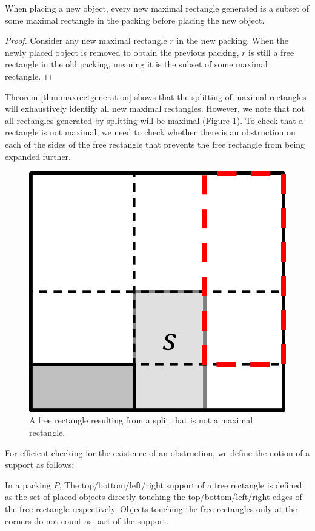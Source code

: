 \documentclass{article}
\begin{document}
\begin{thm}
\label{thm:maxrectgeneration}
When placing a new object, every new maximal rectangle generated is a subset of some maximal rectangle in the packing before placing the new object.
\end{thm}
\begin{proof}
Consider any new maximal rectangle $r$ in the new packing. When the newly placed object is removed to obtain the previous packing, $r$ is still a free rectangle in the old packing, meaning it is the subset of some maximal rectangle.
\end{proof}

Theorem \ref{thm:maxrectgeneration} shows that the splitting of maximal rectangles will exhaustively identify all new maximal rectangles. However, we note that not all rectangles generated by splitting will be maximal (Figure \ref{fig:splitbutnotmaxrect}). To check that a rectangle is not maximal, we need to check whether there is an obstruction on each of the sides of the free rectangle that prevents the free rectangle from being expanded further.

\begin{figure}[!h]
  \centering
  \includegraphics[width=.4\linewidth]{diagrams/splitbutnotmaxrect.png}
  \caption{A free rectangle resulting from a split that is not a maximal rectangle.}
  \label{fig:splitbutnotmaxrect}
\end{figure}

For efficient checking for the existence of an obstruction, we define the notion of a support as follows:

\begin{defn}
In a packing $P$, The top/bottom/left/right support of a free rectangle is defined as the set of placed objects directly touching the top/bottom/left/right edges of the free rectangle respectively. Objects touching the free rectangles only at the corners do not count as part of the support.
\end{defn}
\end{document}
